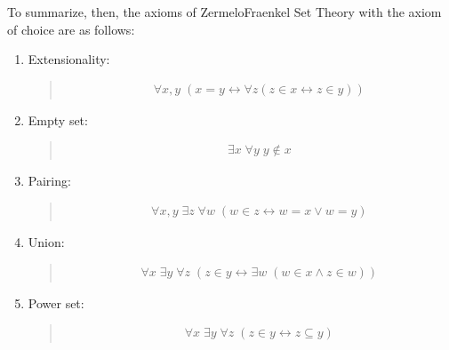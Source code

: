 \documentclass[letterpaper,10pt,english]{sphinxmanual}
\begin{document}
\sphinxAtStartPar
To summarize, then, the axioms of Zermelo\sphinxhyphen{}Fraenkel Set Theory with the axiom of choice are as follows:
\begin{enumerate}
%
\item {} 
\sphinxAtStartPar
Extensionality:
\begin{quote}
\begin{equation*}
\begin{split}\forall x, y \; (x = y \leftrightarrow \forall z (z \in x \leftrightarrow z \in y))\end{split}
\end{equation*}\end{quote}

\item {} 
\sphinxAtStartPar
Empty set:
\begin{quote}
\begin{equation*}
\begin{split}\exists x \; \forall y \; y \notin x\end{split}
\end{equation*}\end{quote}

\item {} 
\sphinxAtStartPar
Pairing:
\begin{quote}
\begin{equation*}
\begin{split}\forall x, y \; \exists z \; \forall w \; (w \in z \leftrightarrow w = x \vee w = y)\end{split}
\end{equation*}\end{quote}

\item {} 
\sphinxAtStartPar
Union:
\begin{quote}
\begin{equation*}
\begin{split}\forall x \; \exists y \; \forall z \; (z \in y \leftrightarrow \exists w \; (w \in x \wedge z \in w))\end{split}
\end{equation*}\end{quote}

\item {} 
\sphinxAtStartPar
Power set:
\begin{quote}
\begin{equation*}
\begin{split}\forall x \; \exists y \; \forall z \; (z \in y \leftrightarrow z \subseteq y)\end{split}
\end{equation*}\end{quote}


\end{enumerate}
\end{document}
